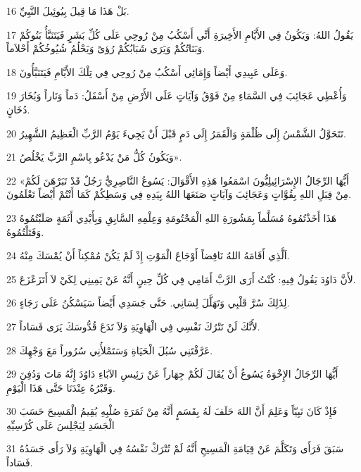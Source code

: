 \par 16 بَلْ هَذَا مَا قِيلَ بِيُوئِيلَ النَّبِيِّ.
\par 17 يَقُولُ اللهُ: وَيَكُونُ فِي الأَيَّامِ الأَخِيرَةِ أَنِّي أَسْكُبُ مِنْ رُوحِي عَلَى كُلِّ بَشَرٍ فَيَتَنَبَّأُ بَنُوكُمْ وَبَنَاتُكُمْ وَيَرَى شَبَابُكُمْ رُؤىً وَيَحْلُمُ شُيُوخُكُمْ أَحْلاَماً.
\par 18 وَعَلَى عَبِيدِي أَيْضاً وَإِمَائِي أَسْكُبُ مِنْ رُوحِي فِي تِلْكَ الأَيَّامِ فَيَتَنَبَّأُونَ.
\par 19 وَأُعْطِي عَجَائِبَ فِي السَّمَاءِ مِنْ فَوْقُ وَآيَاتٍ عَلَى الأَرْضِ مِنْ أَسْفَلُ: دَماً وَنَاراً وَبُخَارَ دُخَانٍ.
\par 20 تَتَحَوَّلُ الشَّمْسُ إِلَى ظُلْمَةٍ وَالْقَمَرُ إِلَى دَمٍ قَبْلَ أَنْ يَجِيءَ يَوْمُ الرَّبِّ الْعَظِيمُ الشَّهِيرُ.
\par 21 وَيَكُونُ كُلُّ مَنْ يَدْعُو بِاسْمِ الرَّبِّ يَخْلُصُ».
\par 22 «أَيُّهَا الرِّجَالُ الإِسْرَائِيلِيُّونَ اسْمَعُوا هَذِهِ الأَقْوَالَ: يَسُوعُ النَّاصِرِيُّ رَجُلٌ قَدْ تَبَرْهَنَ لَكُمْ مِنْ قِبَلِ اللهِ بِقُوَّاتٍ وَعَجَائِبَ وَآيَاتٍ صَنَعَهَا اللهُ بِيَدِهِ فِي وَسَطِكُمْ كَمَا أَنْتُمْ أَيْضاً تَعْلَمُونَ.
\par 23 هَذَا أَخَذْتُمُوهُ مُسَلَّماً بِمَشُورَةِ اللهِ الْمَحْتُومَةِ وَعِلْمِهِ السَّابِقِ وَبِأَيْدِي أَثَمَةٍ صَلَبْتُمُوهُ وَقَتَلْتُمُوهُ.
\par 24 اَلَّذِي أَقَامَهُ اللهُ نَاقِضاً أَوْجَاعَ الْمَوْتِ إِذْ لَمْ يَكُنْ مُمْكِناً أَنْ يُمْسَكَ مِنْهُ.
\par 25 لأَنَّ دَاوُدَ يَقُولُ فِيهِ: كُنْتُ أَرَى الرَّبَّ أَمَامِي فِي كُلِّ حِينٍ أَنَّهُ عَنْ يَمِينِي لِكَيْ لاَ أَتَزَعْزَعَ.
\par 26 لِذَلِكَ سُرَّ قَلْبِي وَتَهَلَّلَ لِسَانِي. حَتَّى جَسَدِي أَيْضاً سَيَسْكُنُ عَلَى رَجَاءٍ.
\par 27 لأَنَّكَ لَنْ تَتْرُكَ نَفْسِي فِي الْهَاوِيَةِ وَلاَ تَدَعَ قُدُّوسَكَ يَرَى فَسَاداً.
\par 28 عَرَّفْتَنِي سُبُلَ الْحَيَاةِ وَسَتَمْلأُنِي سُرُوراً مَعَ وَجْهِكَ.
\par 29 أَيُّهَا الرِّجَالُ الإِخْوَةُ يَسُوغُ أَنْ يُقَالَ لَكُمْ جِهَاراً عَنْ رَئِيسِ الآبَاءِ دَاوُدَ إِنَّهُ مَاتَ وَدُفِنَ وَقَبْرُهُ عِنْدَنَا حَتَّى هَذَا الْيَوْمِ.
\par 30 فَإِذْ كَانَ نَبِيّاً وَعَلِمَ أَنَّ اللهَ حَلَفَ لَهُ بِقَسَمٍ أَنَّهُ مِنْ ثَمَرَةِ صُلْبِهِ يُقِيمُ الْمَسِيحَ حَسَبَ الْجَسَدِ لِيَجْلِسَ عَلَى كُرْسِيِّهِ
\par 31 سَبَقَ فَرَأَى وَتَكَلَّمَ عَنْ قِيَامَةِ الْمَسِيحِ أَنَّهُ لَمْ تُتْرَكْ نَفْسُهُ فِي الْهَاوِيَةِ وَلاَ رَأَى جَسَدُهُ فَسَاداً.
